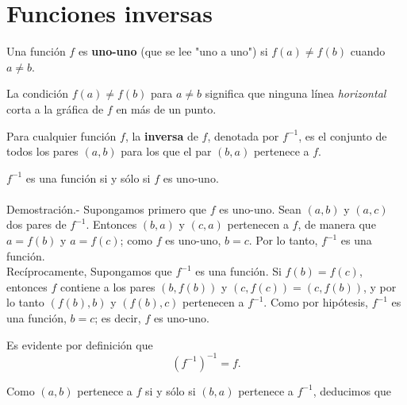 \chapter{Funciones inversas}

\begin{def.}
    Una función $f$ es \textbf{uno-uno} (que se lee "uno a uno") si $f(a)\neq f(b)$ cuando $a\neq b$.
\end{def.}
\vspace{0.3cm}
La condición $f(a)\neq f(b)$ para $a\neq b$ significa que ninguna línea \textit{horizontal} corta a la gráfica de $f$ en más de un punto.

\begin{def.}
    Para cualquier función $f$, la \textbf{inversa} de $f$, denotada por $f^{-1}$, es el conjunto de todos los pares $(a,b)$ para los que el par $(b,a)$ pertenece a $f$.
\end{def.}

\begin{teo}
    $f^{-1}$ es una función si y sólo si $f$ es uno-uno.\\\\
	Demostración.-\; Supongamos primero que $f$ es uno-uno. Sean $(a,b)$ y $(a,c)$ dos pares de $f^{-1}$. Entonces $(b,a)$ y $(c,a)$ pertenecen a $f$, de manera que $a=f(b)$ y $a=f(c)$; como $f$ es uno-uno, $b=c$. Por lo tanto, $f^{-1}$ es una función.\\
	Recíprocamente, Supongamos que $f^{-1}$ es una función. Si $f(b)=f(c)$, entonces $f$ contiene a los pares $\left(b,f(b)\right)$ y $\left(c,f(c)\right)=\left(c,f(b)\right)$, y por lo tanto $\left(f(b),b\right)$ y $\left(f(b),c\right)$ pertenecen a $f^{-1}$. Como por hipótesis, $f^{-1}$ es una función, $b=c$; es decir, $f$ es uno-uno.
\end{teo}
\vspace{0.3cm}
Es evidente por definición que 
$$\left(f^{-1}\right)^{-1}=f.$$

Como $(a,b)$ pertenece a $f$ si y sólo si $(b,a)$ pertenece a $f^{-1}$, deducimos que

